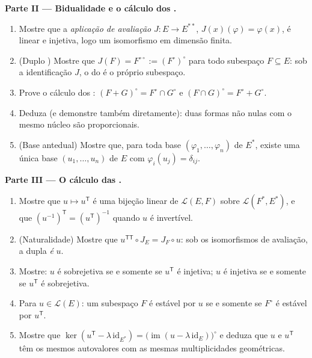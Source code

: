 \begin{problem}
\medskip
\noindent\textbf{Parte II --- Bidualidade e o cálculo dos
.}
\begin{enumerate}[resume]
  \item Mostre que a \emph{aplicação de avaliação} $J \colon E \to
        E^{**}$, $J(x)(\varphi) = \varphi(x)$, é linear e
        injetiva, logo um isomorfismo em dimensão finita.
  \item (Duplo ) Mostre que $J(F) = F^{\circ\circ} :=
        (F^\circ)^\circ$ para todo subespaço $F \subseteq E$: sob
        a identificação $J$, o  do 
        é o próprio subespaço.
  \item Prove o cálculo dos : $(F + G)^\circ = F^\circ
        \cap G^\circ$ e $(F \cap G)^\circ = F^\circ + G^\circ$.
  \item Deduza (e demonstre também diretamente): duas formas não nulas com o
        mesmo núcleo são proporcionais.
  \item (Base antedual) Mostre que, para toda base $(\varphi_1,
        \dots, \varphi_n)$ de $E^*$, existe uma única base
        $(u_1, \dots, u_n)$ de $E$ com $\varphi_i(u_j) =
        \delta_{ij}$.
\end{enumerate}

\medskip
\noindent\textbf{Parte III --- O cálculo das .}
\begin{enumerate}[resume]
  \item Mostre que $u \mapsto u^{\mathsf T}$ é uma bijeção linear
        de $\mathcal{L}(E, F)$ sobre $\mathcal{L}(F^*, E^*)$,
        e que $(u^{-1})^{\mathsf T} = (u^{\mathsf T})^{-1}$
        quando $u$ é invertível.
  \item (Naturalidade) Mostre que $u^{\mathsf T\mathsf T} \circ J_E
        = J_F \circ u$: sob os isomorfismos de avaliação, a
        dupla  \emph{é} $u$.
  \item Mostre: $u$ é sobrejetiva se e somente se $u^{\mathsf T}$ é injetiva;
        $u$ é injetiva se e somente se $u^{\mathsf T}$ é sobrejetiva.
  \item Para $u \in \mathcal{L}(E)$: um subespaço $F$ é estável
        por $u$ se e somente se $F^\circ$ é estável por
        $u^{\mathsf T}$.
  \item Mostre que $\ker(u^{\mathsf T} - \lambda\,
        \mathrm{id}_{E^*}) = \bigl(\operatorname{im}(u - \lambda\,
        \mathrm{id}_E)\bigr)^\circ$ e deduza que $u$ e
        $u^{\mathsf T}$ têm os mesmos autovalores com as mesmas
        multiplicidades geométricas.
\end{enumerate}


\end{problem}
